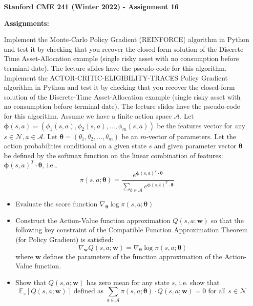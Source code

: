 \documentclass[12pt]{exam}
\begin{document}
\begin{center}
{\large {\bf Stanford CME 241 (Winter 2022) - Assignment 16}}
\end{center}
 
{\large{\bf Assignments:}}
\begin{questions}
 Implement the Monte-Carlo Policy Gradient (REINFORCE) algorithm in Python and test it by checking that you recover the closed-form solution of the Discrete-Time Asset-Allocation example (single risky asset with no consumption before terminal date). The lecture slides have the pseudo-code for this algorithm.
 Implement the ACTOR-CRITIC-ELIGIBILITY-TRACES Policy Gradient algorithm in Python and test it by checking that you recover the closed-form solution of the Discrete-Time Asset-Allocation example (single risky asset with no consumption before terminal date). The lecture slides have the pseudo-code for this algorithm.
\question Assume we have a finite action space $\mathcal{A}$. Let $\bm{\phi}(s,a) = (\phi_1(s,a), \phi_2(s,a), \ldots, \phi_m(s,a))$ be the features vector for any $s \in \mathcal{N}, a \in \mathcal{A}$. Let $\bm{\theta} = (\theta_1, \theta_2, \ldots, \theta_m)$ be an $m$-vector of parameters. Let the action probabilities conditional on a given state $s$ and given parameter vector $\bm{\theta}$ be defined by the softmax function on the linear combination of features: $\bm{\phi}(s,a)^T \cdot \bm{\theta}$, i.e.,
$$\pi(s, a ; \bm{\theta}) = \frac {e^{\bm{\phi}(s,a)^T \cdot \bm{\theta}}} {\sum_{b \in \mathcal{A}} e^{\bm{\phi}(s,b)^T \cdot \bm{\theta}}}$$
\begin{itemize}
\item Evaluate the score function $\nabla_{\bm{\theta}} \log \pi(s, a ; \bm{\theta})$
\item Construct the Action-Value function approximation $Q(s,a; \bm{w})$ so that the following key constraint of the Compatible Function Approximation Theorem (for Policy Gradient) is satisfied:
 $$\nabla_{\bm{w}} Q(s,a;\bm{w}) = \nabla_{\bm{\theta}} \log \pi(s, a ; \bm{\theta})$$
 where $\bm{w}$ defines the parameters of the function approximation of the Action-Value function.
 \item Show that $Q(s,a ; \bm{w})$ has zero mean for any state $s$, i.e. show that
 $$\mathbb{E}_{\pi} [Q(s,a; \bm{w})] \mbox{ defined as } \sum_{a \in \mathcal{A}} \pi(s, a ; \bm{\theta}) \cdot Q(s,a ; \bm{w}) = 0 \text{ for all } s \in \mathcal{N}$$
\end{itemize}

\end{questions}
\end{document}
